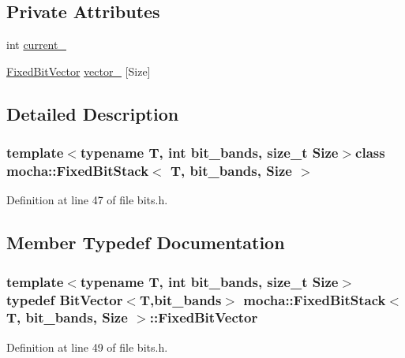 \subsection*{Private Attributes}
\begin{DoxyCompactItemize}
\item 
int \hyperlink{classmocha_1_1_fixed_bit_stack_abd2f0780120850e55587f4fee273b3cc}{current\_\-}
\item 
\hyperlink{classmocha_1_1_bit_vector}{FixedBitVector} \hyperlink{classmocha_1_1_fixed_bit_stack_a7ae9a291d0b60997af8cfb9f535f7c65}{vector\_\-} \mbox{[}Size\mbox{]}
\end{DoxyCompactItemize}


\subsection{Detailed Description}
\subsubsection*{template$<$typename T, int bit\_\-bands, size\_\-t Size$>$class mocha::FixedBitStack$<$ T, bit\_\-bands, Size $>$}



Definition at line 47 of file bits.h.



\subsection{Member Typedef Documentation}
\hypertarget{classmocha_1_1_fixed_bit_stack_aee038548c8d6aac4c6dd319f83f2b9d7}{
\subsubsection[{FixedBitVector}]{\setlength{\rightskip}{0pt plus 5cm}template$<$typename T, int bit\_\-bands, size\_\-t Size$>$ typedef {\bf BitVector}$<$T,bit\_\-bands$>$ {\bf mocha::FixedBitStack}$<$ T, bit\_\-bands, Size $>$::{\bf FixedBitVector}}}
\label{classmocha_1_1_fixed_bit_stack_aee038548c8d6aac4c6dd319f83f2b9d7}


Definition at line 49 of file bits.h.



